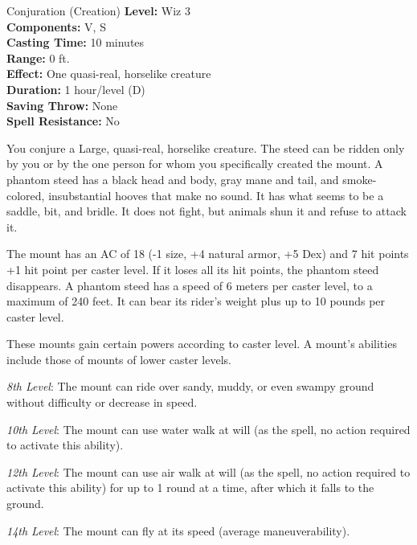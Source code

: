 {Conjuration (Creation)}
{
	\textbf{Level:}
	Wiz 3\\
	\textbf{Components:}
	V, S\\
	\textbf{Casting Time:}
	10 minutes\\
	\textbf{Range:}
	0 ft.\\
	\textbf{Effect:}
	One quasi-real, horselike creature\\
	\textbf{Duration:}
	1 hour/level (D)\\
	\textbf{Saving Throw:}
	None\\
	\textbf{Spell Resistance:}
	No\\
}
{
	You conjure a Large, quasi-real, horselike creature. The steed can be ridden only by you or by the one person for whom you specifically created the mount. A phantom steed has a black head and body, gray mane and tail, and smoke-colored, insubstantial hooves that make no sound. It has what seems to be a saddle, bit, and bridle. It does not fight, but animals shun it and refuse to attack it.

	The mount has an AC of 18 (-1 size, +4 natural armor, +5 Dex) and 7 hit points +1 hit point per caster level. If it loses all its hit points, the phantom steed disappears. A phantom steed has a speed of 6 meters per caster level, to a maximum of 240 feet. It can bear its rider's weight plus up to 10 pounds per caster level.

	These mounts gain certain powers according to caster level. A mount's abilities include those of mounts of lower caster levels.

	\textit{8th Level}:
	The mount can ride over sandy, muddy, or even swampy ground without difficulty or decrease in speed.

	\textit{10th Level}:
	The mount can use water walk at will (as the spell, no action required to activate this ability).

	\textit{12th Level}:
	The mount can use air walk at will (as the spell, no action required to activate this ability) for up to 1 round at a time, after which it falls to the ground.

	\textit{14th Level}:
	The mount can fly at its speed (average maneuverability).

}
